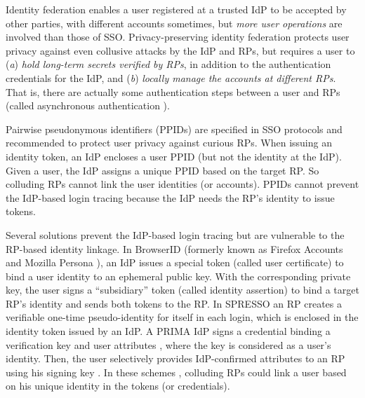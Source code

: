 Identity federation enables a user registered at a trusted IdP to be accepted by other parties,
            with different accounts sometimes,
        but \emph{more user operations} are involved than those of SSO.
Privacy-preserving identity federation
    protects user privacy against even collusive attacks by the IdP and RPs,
    but requires a user \cite{ELPASSO,UnlimitID,hyperledge-idemix,PseudoID,Opaak,uprov} to (\emph{a}) \emph{hold long-term secrets verified by RPs},
            in addition to the authentication credentials for the IdP,
                and (\emph{b}) \emph{locally manage the accounts at different RPs}.
That is, there are actually some authentication steps between a user and RPs (called asynchronous authentication \cite{ELPASSO}).

Pairwise pseudonymous identifiers (PPIDs) are specified in SSO protocols \cite{OpenIDConnect, SAMLIdentifier} and recommended \cite{NIST2017draft}
to protect user privacy against curious RPs.
When issuing an identity token,
        an IdP encloses a user PPID (but not the identity at the IdP).
Given a user, the IdP assigns a unique PPID based on the target RP.
So colluding RPs cannot link the user identities (or accounts).
PPIDs cannot prevent the IdP-based login tracing because the IdP needs the RP's identity to issue tokens.



Several solutions prevent the IdP-based login tracing but are vulnerable to the RP-based identity linkage.
In BrowserID \cite{BrowserID} (formerly known as Firefox Accounts \cite{FirefoxAccount} and Mozilla Persona \cite{persona}), an IdP %
issues a special token (called user certificate) to bind a user identity to an ephemeral public key.
With the corresponding private key, the user signs a ``subsidiary'' token (called identity assertion) to bind a target RP's identity and sends both tokens to the RP.
In SPRESSO \cite{SPRESSO} an RP creates a verifiable one-time pseudo-identity for itself in each login, which is enclosed in the identity token issued by an IdP. %
A PRIMA IdP signs a credential
 binding a verification key and user attributes \cite{prima},
  where the key is considered as a user's identity.
Then, the user selectively provides IdP-confirmed attributes to an RP using his signing key \cite{Oblivion}.
In these schemes \cite{BrowserID,SPRESSO,prima}, colluding RPs could link a user based on his unique identity in the tokens (or credentials).



